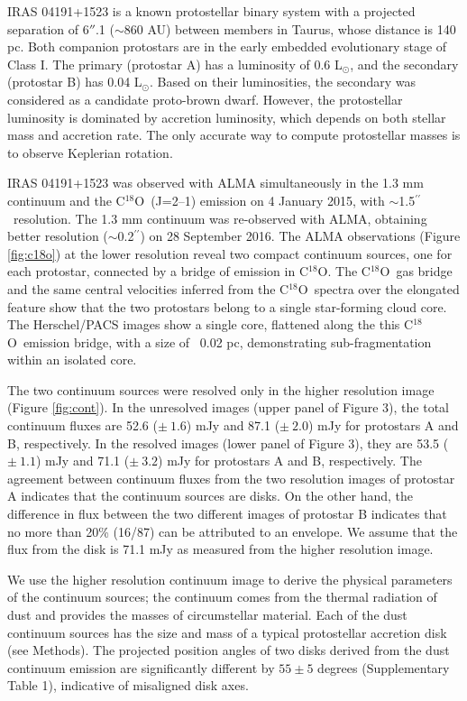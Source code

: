 \documentclass{nature}
\newcommand{\lsun}{\mbox{L$_\odot$}}%
\newcommand{\cooo}{\mbox{C$^{18}$O}}
\newcommand{\arcsec}{\mbox{$^{\prime \prime}$}}
\begin{document}
IRAS 04191+1523 is a known protostellar binary system
with a projected separation of 6$''$.1 ($\sim 860$ AU) between members\cite{Duchene2004} in Taurus,
whose distance is 140 pc.
Both companion protostars are in the early embedded evolutionary stage of Class I\cite{Dunham2006,Luhman2010}.
The primary (protostar A) has a luminosity of 0.6 \lsun,
and the secondary (protostar B) has
0.04 \lsun\cite{Duchene2004,Connelley2008,Dang-Duc2016}.
Based on their luminosities, the secondary was considered as a candidate proto-brown dwarf\cite{Bulger2014}.
However, the protostellar luminosity is dominated by accretion luminosity,
which depends on both stellar mass and accretion rate. 
The only accurate way to compute protostellar masses is to observe
Keplerian rotation\cite{Tobin2012}.


IRAS 04191+1523 was observed with ALMA simultaneously in the 1.3 mm continuum and the \cooo\ (J=2--1) emission on 4 January 2015, with $\sim$1.5\arcsec\ resolution.
The 1.3 mm continuum was re-observed with ALMA, obtaining better resolution ($\sim$0.2\arcsec) on 28 September 2016.
The ALMA observations (Figure \ref{fig:c18o}) at the lower resolution reveal
two compact continuum sources, one for each protostar,
connected by a bridge of emission in \cooo. 
The \cooo\ gas bridge and the same central velocities inferred from the \cooo\ spectra over the elongated feature show
that the two protostars belong to a single star-forming cloud core. 
 The Herschel/PACS images\cite{Bulger2014} show a single core, flattened along the this \cooo\ 
emission bridge, with a size of ~0.02 pc, demonstrating sub-fragmentation within an isolated core.

The two continuum sources were resolved only in the higher resolution image (Figure \ref{fig:cont}). 
In the unresolved images (upper panel of Figure 3), 
the total continuum fluxes are 52.6 ($\pm~1.6$) mJy and 87.1 ($\pm~2.0$) mJy for protostars A and B, respectively. 
In the resolved images (lower panel of Figure 3), 
they are 53.5 ($\pm~1.1$) mJy and 71.1 ($\pm~3.2$) mJy for protostars A and B, respectively.
The agreement between continuum fluxes from the two resolution images of protostar A indicates 
that the continuum sources are disks. 
On the other hand, the difference in flux between the two different images of protostar B indicates 
that no more than 20\% (16/87) can be attributed to an envelope. 
We assume that the flux from the disk is 71.1 mJy as measured from the higher resolution image.

We use the higher resolution continuum image to derive the physical parameters of the continuum sources;
the continuum comes from the thermal radiation of dust and provides the masses of circumstellar material.
Each of the dust continuum sources has the size and mass of a typical protostellar accretion disk (see Methods).
The projected position angles of two disks derived from the dust continuum emission are significantly different by $55\pm 5$ degrees
(Supplementary Table 1), indicative of misaligned disk axes.
\end{document}
